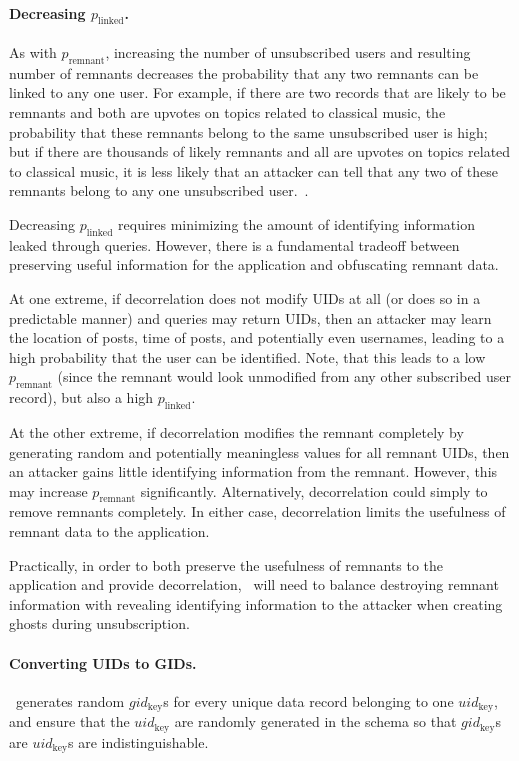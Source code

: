\paragraph{Decreasing $p_{\text{linked}}$.}
As with $p_{\text{remnant}}$, increasing the number of unsubscribed users and resulting
number of remnants decreases the probability that any two remnants can be linked to any one
user. For example, if there are two records that are likely to be remnants and both are upvotes on topics related to
classical music, the probability that these remnants belong to the same unsubscribed user is high; but if
there are thousands of likely remnants and all are upvotes on topics related to classical music, it
is less likely that an attacker can tell that any two of these remnants belong to any one
unsubscribed user.~.

Decreasing $p_\text{linked}$ requires minimizing the amount of identifying information leaked
through queries. However, there is a fundamental tradeoff between preserving useful information for
the application and obfuscating remnant data. 

At one extreme, if decorrelation does not modify UIDs at all (or does so in a predictable manner)
and queries may return UIDs, then an attacker may learn the location of posts, time of posts, and
potentially even usernames, leading to a high probability that the user can be identified. Note,
that this leads to a low $p_\text{remnant}$ (since the remnant would look unmodified from any
other subscribed user record), but also a high $p_\text{linked}$.

At the other extreme, if decorrelation modifies the remnant completely by generating random and
potentially meaningless values for all remnant UIDs, then an attacker gains little identifying
information from the remnant. However, this may increase $p_\text{remnant}$ significantly.
Alternatively, decorrelation could simply to remove remnants completely. In either case, decorrelation limits the usefulness of remnant data to the application. 

Practically, in order to both preserve the usefulness of remnants to the application and provide
decorrelation, \sys~will need to balance destroying remnant information with revealing identifying
information to the attacker when creating ghosts during unsubscription. 

\paragraph{Converting UIDs to GIDs.}
\sys~generates random $gid_{\text{key}}$s for every unique data record belonging to one
$uid_{\text{key}}$, and ensure that the $uid_{\text{key}}$ are randomly generated in the schema so
that $gid_\text{key}$s are $uid_\text{key}$s are indistinguishable.

